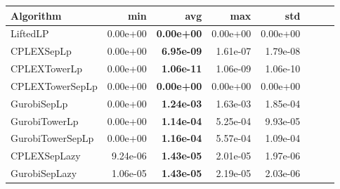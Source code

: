 \begin{tabular}{lrrrrrrr}
Algorithm & min & avg & max & std
\\
\hline
LiftedLP&0.00e+00& \bf0.00e+00& 0.00e+00& 0.00e+00\\
CPLEXSepLp&0.00e+00& \bf6.95e-09& 1.61e-07& 1.79e-08\\
CPLEXTowerLp&0.00e+00& \bf1.06e-11& 1.06e-09& 1.06e-10\\
CPLEXTowerSepLp&0.00e+00& \bf0.00e+00& 0.00e+00& 0.00e+00\\
GurobiSepLp&0.00e+00& \bf1.24e-03& 1.63e-03& 1.85e-04\\
GurobiTowerLp&0.00e+00& \bf1.14e-04& 5.25e-04& 9.93e-05\\
GurobiTowerSepLp&0.00e+00& \bf1.16e-04& 5.57e-04& 1.09e-04\\
CPLEXSepLazy&9.24e-06& \bf1.43e-05& 2.01e-05& 1.97e-06\\
GurobiSepLazy&1.06e-05& \bf1.43e-05& 2.19e-05& 2.03e-06
\end{tabular}
